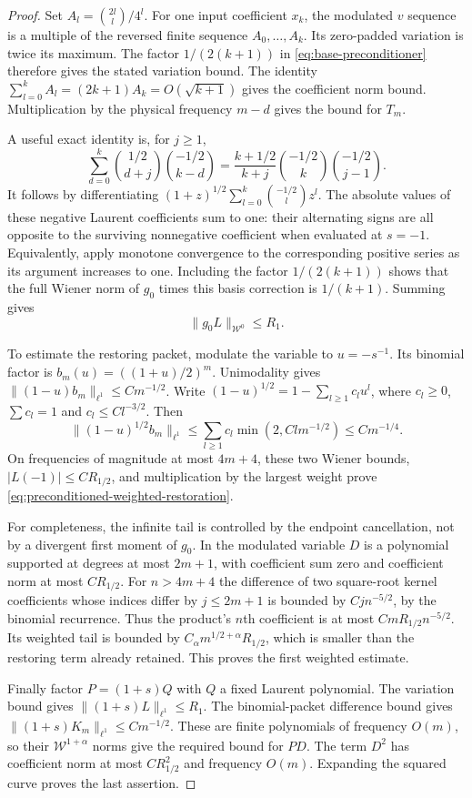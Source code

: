 \documentclass[11pt]{article}
\begin{document}
\begin{proof}
Set $A_l=\binom{2l}{l}/4^l$. For one input coefficient $x_k$, the
modulated $v$ sequence is a multiple of the reversed finite sequence
$A_0,\ldots,A_k$. Its zero-padded variation is twice its maximum.
The factor $1/(2(k+1))$ in \eqref{eq:base-preconditioner} therefore
gives the stated variation bound. The identity
$\sum_{l=0}^kA_l=(2k+1)A_k=O(\sqrt{k+1})$ gives the coefficient
norm bound. Multiplication by the physical frequency $m-d$ gives
the bound for $T_m$.

A useful exact identity is, for $j\ge1$,
\[
 \sum_{d=0}^k\binom{1/2}{d+j}\binom{-1/2}{k-d}
  =\frac{k+1/2}{k+j}\binom{-1/2}{k}\binom{-1/2}{j-1}.
\]
It follows by differentiating
$(1+z)^{1/2}\sum_{l=0}^k\binom{-1/2}{l}z^l$.
The absolute values of these negative Laurent coefficients sum to
one: their alternating signs are all opposite to the surviving
nonnegative coefficient when evaluated at $s=-1$. Equivalently,
apply monotone convergence to the corresponding positive series
as its argument increases to one. Including the factor
$1/(2(k+1))$ shows that the full Wiener norm of $g_0$ times this
basis correction is $1/(k+1)$. Summing gives
\[
 \|g_0L\|_{\mathcal W^0}\le R_1.
\]

To estimate the restoring packet, modulate the variable to
$u=-s^{-1}$. Its binomial factor is $b_m(u)=((1+u)/2)^m$.
Unimodality gives $\|(1-u)b_m\|_{\ell^1}\le C m^{-1/2}$.
Write $(1-u)^{1/2}=1-\sum_{l\ge1}c_lu^l$, where
$c_l\ge0$, $\sum c_l=1$ and $c_l\le C l^{-3/2}$.
Then
\[
 \|(1-u)^{1/2}b_m\|_{\ell^1}
 \le\sum_{l\ge1}c_l\min(2,Clm^{-1/2})
 \le C m^{-1/4}.
\]
On frequencies of magnitude at most $4m+4$, these two Wiener
bounds, $|L(-1)|\le C R_{1/2}$, and multiplication by the largest
weight prove \eqref{eq:preconditioned-weighted-restoration}.

For completeness, the infinite tail is controlled by the endpoint
cancellation, not by a divergent first moment of $g_0$. In the
modulated variable $D$ is a polynomial supported at degrees at most
$2m+1$, with coefficient sum zero and coefficient norm at most
$CR_{1/2}$. For $n>4m+4$ the difference of two square-root kernel
coefficients whose indices differ by $j\le2m+1$ is bounded by
$Cj n^{-5/2}$, by the binomial recurrence. Thus the product's
$n$th coefficient is at most $CmR_{1/2}n^{-5/2}$. Its weighted tail
is bounded by $C_\alpha m^{1/2+\alpha}R_{1/2}$, which is smaller
than the restoring term already retained. This proves the first
weighted estimate.

Finally factor $P=(1+s)Q$ with $Q$ a fixed Laurent polynomial.
The variation bound gives $\|(1+s)L\|_{\ell^1}\le R_1$.
The binomial-packet difference bound gives
$\|(1+s)K_m\|_{\ell^1}\le Cm^{-1/2}$.
These are finite polynomials of frequency $O(m)$, so their
$\mathcal W^{1+\alpha}$ norms give the required bound for $PD$.
The term $D^2$ has coefficient norm at most $CR_{1/2}^2$ and
frequency $O(m)$. Expanding the squared curve proves the last assertion.
\end{proof}
\end{document}
